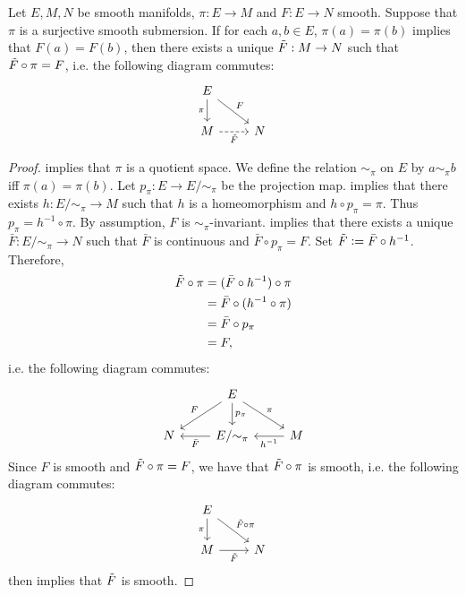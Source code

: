 \documentclass{book}
\begin{document}
	\begin{ex} 
		Let $E, M, N$ be smooth manifolds, $\pi: E \rightarrow M$ and $F: E \rightarrow N$ smooth. Suppose that $\pi$ is a surjective smooth submersion. If for each $a,b \in E$, $\pi(a) = \pi(b)$ implies that $F(a) = F(b)$, then there exists a unique $\tilde{F}: M \rightarrow N$ such that $\tilde{F} \circ \pi = F$, i.e. the following diagram commutes:
		\[ 
		\begin{tikzcd}
			E \arrow[d, "\pi"'] \arrow[dr, "F"] &   \\
			M \arrow[r, "\tl{F}"', dashrightarrow] &  N
		\end{tikzcd}
		\]
	\end{ex}

	\begin{proof}
		 implies that $\pi$ is a quotient space. We define the relation $\sim_{\pi}$ on $E$ by $a \sim_{\pi} b$ iff $\pi(a) = \pi(b)$. Let $p_{\pi}:E \rightarrow E/{\sim_{\pi}}$ be the projection map.  implies that there exists $h: E/{\sim_{\pi}} \rightarrow M$ such that $h$ is a homeomorphism and $h \circ p_{\pi} = \pi$. Thus $p_{\pi} = h^{-1} \circ \pi$. By assumption, $F$ is $\sim_{\pi}$-invariant.  implies that there exists a unique $\bar{F}: E/{\sim_{\pi}} \rightarrow N$ such that $\bar{F}$ is continuous and $\bar{F} \circ p_{\pi} = F$. Set $\tilde{F} \vcentcolon= \bar{F} \circ h^{-1}$. Therefore,
		\begin{align*}
			\tilde{F} \circ \pi
			& = (\bar{F} \circ h^{-1}) \circ \pi \\
			& = \bar{F} \circ (h^{-1} \circ \pi) \\
			& = \bar{F} \circ p_{\pi} \\
			& = F,
		\end{align*}
		i.e. the following diagram commutes: 
		\[ 
		\begin{tikzcd}
			& E \arrow[dl, "F"'] \arrow[d, "p_{\pi}"] \arrow[dr, "\pi"] &   \\
			N & E/{\sim_{\pi}} \arrow[l, "\bar{F}"] &  M \arrow[l, "h^{-1}"]
		\end{tikzcd}
		\]
		Since $F$ is smooth and $\tilde{F} \circ \pi = F$, we have that $\tilde{F} \circ \pi$ is smooth, i.e. the following diagram commutes: 
		\[ 
		\begin{tikzcd}
			E \arrow[d, "\pi"'] \arrow[dr, "\tl{F} \circ \pi"] &   \\
			M \arrow[r, "\tl{F}"'] &  N
		\end{tikzcd}
		\]
		 then implies that $\tilde{F}$ is smooth.
	\end{proof}
\end{document}
